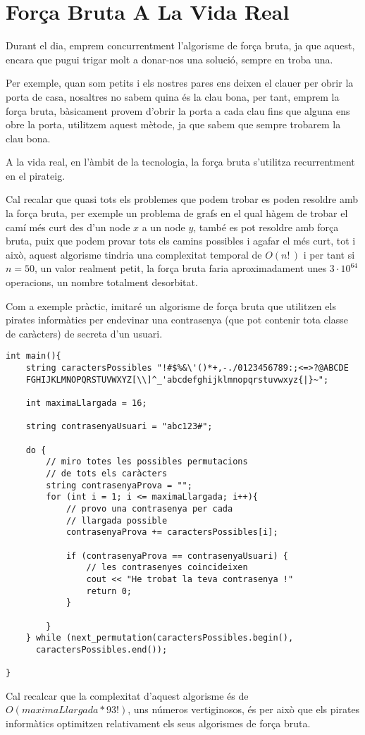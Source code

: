 \section{Força Bruta A La Vida Real}

Durant el dia, emprem concurrentment l'algorisme de força bruta, ja que aquest, encara que pugui trigar molt a donar-nos una solució, sempre en troba una.

Per exemple, quan som petits i els nostres pares ens deixen el clauer per obrir la porta de casa, nosaltres no sabem quina és la clau bona, per tant, emprem la força bruta, bàsicament provem d'obrir la porta a cada clau fins que alguna ens obre la porta, utilitzem aquest mètode, ja que sabem que sempre trobarem la clau bona.

A la vida real, en l'àmbit de la tecnologia, la força bruta s'utilitza recurrentment en el pirateig.

Cal recalar que quasi tots els problemes que podem trobar es poden resoldre amb la força bruta, per exemple un problema de grafs en el qual hàgem de trobar el camí més curt des d'un node $x$ a un node $y$, també es pot resoldre amb força bruta, puix que podem provar tots els camins possibles i agafar el més curt, tot i això, aquest algorisme tindria una complexitat temporal de $O({n\displaystyle !\,})$ i per tant si $n = 50$, un valor realment petit, la força bruta faria aproximadament unes $3 \cdot 10^{64}$ operacions, un nombre totalment desorbitat.

Com a exemple pràctic, imitaré un algorisme de força bruta que utilitzen els pirates informàtics per endevinar una contrasenya (que pot contenir tota classe de caràcters) de secreta d'un usuari.

\begin{lstlisting}
int main(){
    string caractersPossibles "!#$%&\'()*+,-./0123456789:;<=>?@ABCDE
    FGHIJKLMNOPQRSTUVWXYZ[\\]^_'abcdefghijklmnopqrstuvwxyz{|}~";
    
    int maximaLlargada = 16;
    
    string contrasenyaUsuari = "abc123#";
    
    do {
        // miro totes les possibles permutacions
        // de tots els caràcters
        string contrasenyaProva = "";
        for (int i = 1; i <= maximaLlargada; i++){
            // provo una contrasenya per cada
            // llargada possible
            contrasenyaProva += caractersPossibles[i];
            
            if (contrasenyaProva == contrasenyaUsuari) {
                // les contrasenyes coincideixen
                cout << "He trobat la teva contrasenya !"
                return 0;
            }
        
        }
    } while (next_permutation(caractersPossibles.begin(), 
      caractersPossibles.end());

}
\end{lstlisting}

Cal recalcar que la complexitat d'aquest algorisme és de $O(maximaLlargada * 93!)$, uns números vertiginosos, és per això que els pirates informàtics optimitzen relativament els seus algorismes de força bruta.